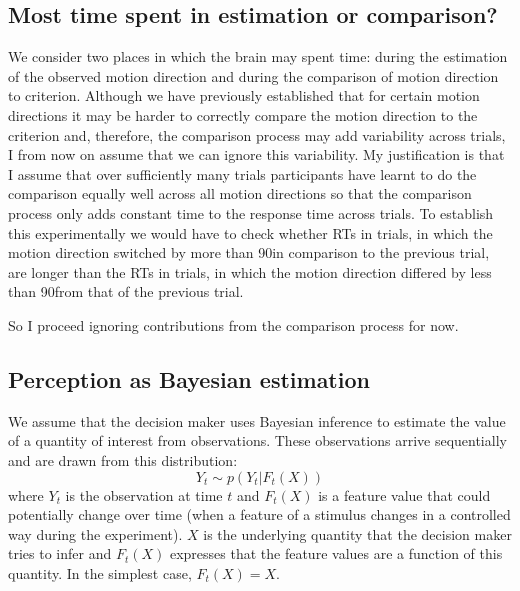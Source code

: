 \documentclass[10pt,a4paper]{article}
\begin{document}
\subsection{Most time spent in estimation or comparison?}
We consider two places in which the brain may spent time: during the estimation of the observed motion direction and during the comparison of motion direction to criterion. Although we have previously established that for certain motion directions it may be harder to correctly compare the motion direction to the criterion and, therefore, the comparison process may add variability across trials, I from now on assume that we can ignore this variability. My justification is that I assume that over sufficiently many trials participants have learnt to do the comparison equally well across all motion directions so that the comparison process only adds constant time to the response time across trials. To establish this experimentally we would have to check whether RTs in trials, in which the motion direction switched by more than 90\degree in comparison to the previous trial, are longer than the RTs in trials, in which the motion direction differed by less than 90\degree from that of the previous trial.

So I proceed ignoring contributions from the comparison process for now.


\subsection{Perception as Bayesian estimation}
We assume that the decision maker uses Bayesian inference to estimate the value of a quantity of interest from observations. These observations arrive sequentially and are drawn from this distribution:
\begin{equation}
Y_t \sim p(Y_t | F_t(X))
\end{equation}
where $Y_t$ is the observation at time $t$ and $F_t(X)$ is a feature value that could potentially change over time (when a feature of a stimulus changes in a controlled way during the experiment). $X$ is the underlying quantity that the decision maker tries to infer and $F_t(X)$ expresses that the feature values are a function of this quantity. In the simplest case, $F_t(X) = X$.
\end{document}
